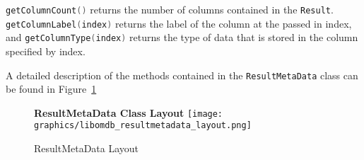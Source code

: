 \documentclass[letterpaper, 12pt]{article}
\newcommand{\inlinecode}[1]{\colorbox{codegrey}{\lstinline[language=C++]{#1}}}
\begin{document}
  \inlinecode{getColumnCount()} returns the number of
  columns contained in the \inlinecode{Result}.
  \inlinecode{getColumnLabel(index)} returns the label of the
  column at the passed in index, and
  \inlinecode{getColumnType(index)} returns the type of data that
  is stored in the column specified by index.
  \par\vspace{\baselineskip}
  A detailed description of the methods contained in the \inlinecode{ResultMetaData}
  class can be found in Figure~\ref{fig:reultmetadata_methods}
  \begin{figure}
    \label{fig:reultmetadata_methods}
    \centering
    \textbf{ResultMetaData Class Layout}
    \texttt{[image: graphics/libomdb\_resultmetadata\_layout.png]}
    \caption{ResultMetaData Layout}
  \end{figure}

  \newpage
\end{document}
